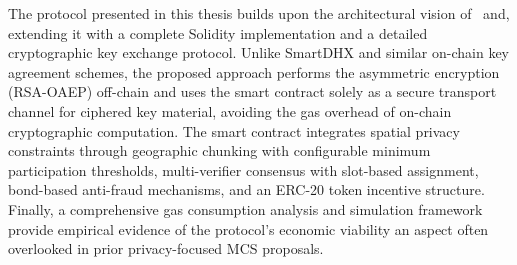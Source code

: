 The protocol presented in this thesis builds upon the architectural vision
of~\cite{bedogni2024crowdsensing} and\cite{gigli2024decentralization}, extending it with a complete Solidity
implementation and a detailed cryptographic key exchange protocol.
Unlike SmartDHX and similar on-chain key agreement schemes, the proposed approach
performs the asymmetric encryption (RSA-OAEP) off-chain and uses the smart
contract solely as a secure transport channel for ciphered key material,
avoiding the gas overhead of on-chain cryptographic computation.
The smart contract integrates spatial privacy constraints through geographic chunking
with configurable minimum participation thresholds, multi-verifier consensus
with slot-based assignment, bond-based anti-fraud mechanisms, and an ERC-20
token incentive structure.
Finally, a comprehensive gas consumption analysis and simulation framework provide
empirical evidence of the protocol's economic viability an aspect often overlooked in prior privacy-focused MCS proposals.

